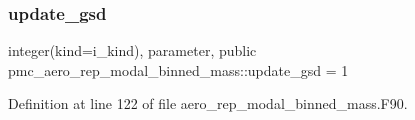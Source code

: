 \subsubsection{\texorpdfstring{update\+\_\+gsd}{update\_gsd}}
{\footnotesize\ttfamily integer(kind=i\+\_\+kind), parameter, public pmc\+\_\+aero\+\_\+rep\+\_\+modal\+\_\+binned\+\_\+mass\+::update\+\_\+gsd = 1}



Definition at line 122 of file aero\+\_\+rep\+\_\+modal\+\_\+binned\+\_\+mass.\+F90.

